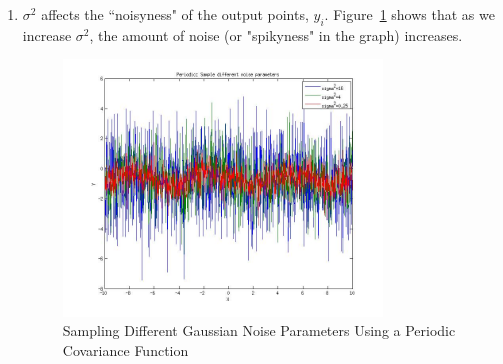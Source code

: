 \documentclass{article}
\begin{document}
\begin{enumerate}[label=(\alph*)]
\item $\sigma^2$ affects the ``noisyness" of the output points, $y_i$.
Figure~\ref{fig:1b} shows that as we increase $\sigma^2$, the amount of noise (or "spikyness" in the graph) increases.

\begin{figure}[H]
\centering
\includegraphics[width=0.8\textwidth]{1_b.jpg}
\caption{Sampling Different Gaussian Noise Parameters Using a Periodic Covariance Function}
\label{fig:1b}
\end{figure}


\end{enumerate}
\end{document}

